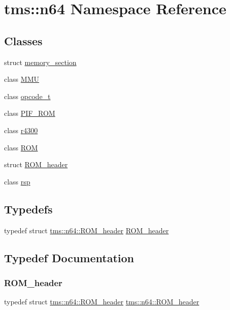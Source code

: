 \hypertarget{namespacetms_1_1n64}{}\section{tms\+:\+:n64 Namespace Reference}
\label{namespacetms_1_1n64}
\subsection*{Classes}
\begin{DoxyCompactItemize}
\item 
struct \hyperlink{structtms_1_1n64_1_1memory__section}{memory\+\_\+section}
\item 
class \hyperlink{classtms_1_1n64_1_1_m_m_u}{M\+MU}
\item 
class \hyperlink{classtms_1_1n64_1_1opcode__t}{opcode\+\_\+t}
\item 
class \hyperlink{classtms_1_1n64_1_1_p_i_f___r_o_m}{P\+I\+F\+\_\+\+R\+OM}
\item 
class \hyperlink{classtms_1_1n64_1_1r4300}{r4300}
\item 
class \hyperlink{classtms_1_1n64_1_1_r_o_m}{R\+OM}
\item 
struct \hyperlink{structtms_1_1n64_1_1_r_o_m__header}{R\+O\+M\+\_\+header}
\item 
class \hyperlink{classtms_1_1n64_1_1rsp}{rsp}
\end{DoxyCompactItemize}
\subsection*{Typedefs}
\begin{DoxyCompactItemize}
\item 
typedef struct \hyperlink{structtms_1_1n64_1_1_r_o_m__header}{tms\+::n64\+::\+R\+O\+M\+\_\+header} \hyperlink{namespacetms_1_1n64_a0c48c69e2bb8c811706d984778b29fb3}{R\+O\+M\+\_\+header}
\end{DoxyCompactItemize}


\subsection{Typedef Documentation}
\mbox{\label{namespacetms_1_1n64_a0c48c69e2bb8c811706d984778b29fb3}} 
\subsubsection{\texorpdfstring{R\+O\+M\+\_\+header}{ROM\_header}}
{\footnotesize\ttfamily typedef struct \hyperlink{structtms_1_1n64_1_1_r_o_m__header}{tms\+::n64\+::\+R\+O\+M\+\_\+header}  \hyperlink{structtms_1_1n64_1_1_r_o_m__header}{tms\+::n64\+::\+R\+O\+M\+\_\+header}}

